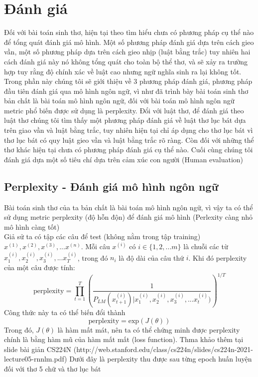 \documentclass[a4paper]{article}
\theoremstyle{definition}
\begin{document}
\section{Đánh giá}
Đối với bài toán sinh thơ, hiện tại theo tìm hiểu chưa có phương pháp cụ thể nào để tổng quát đánh giá mô hình. Một số phương pháp đánh giá dựa trên cách gieo vần, một số phương pháp dựa trên cách gieo nhịp (luật bằng trắc) tuy nhiên hai cách đánh giá này nó không tổng quát cho toàn bộ thể thơ, và sẽ xảy ra trường hợp tuy rằng độ chính xác về luật cao nhưng ngữ nghĩa sinh ra lại không tốt. \\
Trong phần này chúng tôi sẽ giới thiệu về 3 phương pháp đánh giá, phương pháp đầu tiên đánh giá qua mô hình ngôn ngữ, vì như đã trình bày bài toán sinh thơ bản chất là bài toán mô hình ngôn ngữ, đối với bài toán mô hình ngôn ngữ metric phổ biến được sử dụng là perplexity. Đổi với luật thơ,  để đánh giá theo luật thơ chúng tôi tìm thấy một phương pháp đánh giá về luật thơ lục bát dựa trên giao vần và luật bằng trắc, tuy nhiên hiện tại chỉ áp dụng cho thơ lục bát vì thơ lục bát có quy luật gieo vần và luật bằng trắc rõ ràng. Còn đối với những thể thơ khác hiện tại chưa có phương pháp đánh giá cụ thể nào. Cuối cùng chúng tôi đánh giá dựa một số tiêu chí dựa trên cảm xúc con người (Human evaluation)
\subsection{Perplexity - Đánh giá mô hình ngôn ngữ}
Bài toán sinh thơ của ta bản chất là bài toán mô hình ngôn ngữ, vì vậy ta có thể sử dụng metric perplexity (độ hỗn độn) để đánh giá mô hình (Perlexity càng nhỏ mô hình càng tốt) \\
Giả sử ta có tập các câu để test (không nằm trong tập training) $x^{(1)},x^{(2)},x^{(3)},...x^{(n)}$. Mỗi câu $x^{(i)}$ có $i \in \{1,2,...m\}$ là chuỗi các từ $x^{(i)}_1,x^{(i)}_2,x^{(i)}_3,...x^{(i)}_T$, trong đó $n_i$ là độ dài của câu thứ $i$.
Khi đó perplexity của một câu được tính: 
$$\text{perplexity} = \prod_{t=1}^{T}(\frac{1}{P_{LM}(x^{(i)}_{t+1})|x^{(i)}_1,x^{(i)}_2,x^{(i)}_3,...x^{(i)}_t)})^{1/T}$$
Công thức này ta có thể  biến đổi thành
$$\text{perplexity} = \text{exp}(J(\theta))$$
Trong đó, $J(\theta)$ là hàm mất mát, nên ta có thể chứng minh được perplexity chính là bằng hàm mũ của hàm mất mất (loss function). Thma khảo thêm tại slide bài giản CS224N (http://web.stanford.edu/class/cs224n/slides/cs224n-2021-lecture05-rnnlm.pdf)
Dưới đây là perplexity thu được sau từng epoch huấn luyện đối với thơ 5 chữ và thơ lục bát
\end{document}
